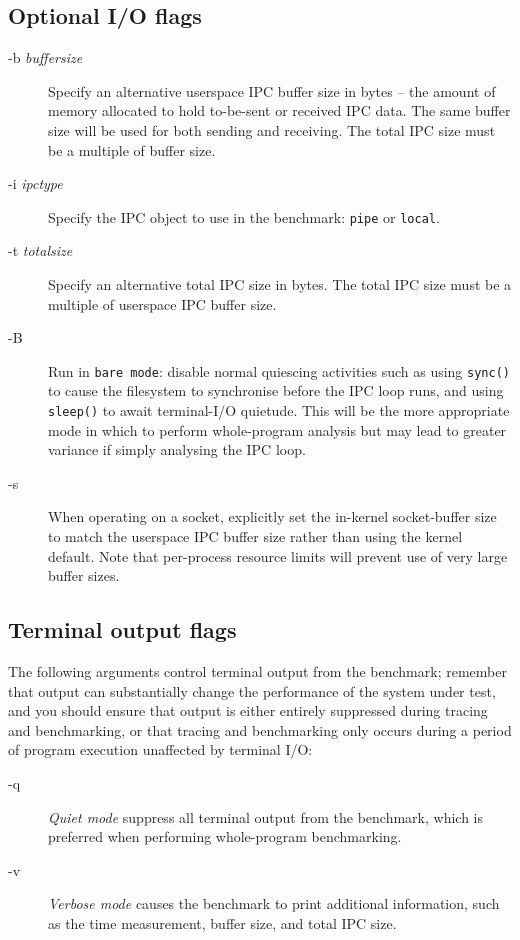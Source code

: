 \documentclass[a4paper,10pt]{article}
\begin{document}
\subsection*{Optional I/O flags}

\begin{description}
\item[-b \textit{buffersize}] Specify an alternative userspace IPC buffer size
  in bytes -- the amount of memory allocated to hold to-be-sent or received
  IPC data.
  The same buffer size will be used for both sending and receiving.
  The total IPC size must be a multiple of buffer size.

\item[-i \textit{ipctype}] Specify the IPC object to use in the benchmark:
  \texttt{pipe} or \texttt{local}.

\item[-t \textit{totalsize}] Specify an alternative total IPC size in bytes.
  The total IPC size must be a multiple of userspace IPC buffer size.

\item[-B] Run in \texttt{bare mode}: disable normal quiescing activities such
  as using \texttt{sync()} to cause the filesystem to synchronise before the
  IPC loop runs, and using \texttt{sleep()} to await terminal-I/O quietude.
  This will be the more appropriate mode in which to perform whole-program
  analysis but may lead to greater variance if simply analysing the IPC loop.

\item[-s] When operating on a socket, explicitly set the in-kernel
  socket-buffer size to match the userspace IPC buffer size rather than using
  the kernel default.
  Note that per-process resource limits will prevent use of very large buffer
  sizes.
\end{description}

\subsection*{Terminal output flags}

\noindent
The following arguments control terminal output from the benchmark; remember
that output can substantially change the performance of the system under test,
and you should ensure that output is either entirely suppressed during tracing
and benchmarking, or that tracing and benchmarking only occurs during a period
of program execution unaffected by terminal I/O:

\begin{description}
\item[-q] \textit{Quiet mode} suppress all terminal output from the benchmark,
  which is preferred when performing whole-program benchmarking.

\item[-v] \textit{Verbose mode} causes the benchmark to print additional
  information, such as the time measurement, buffer size, and total IPC size.
\end{description}
\end{document}
